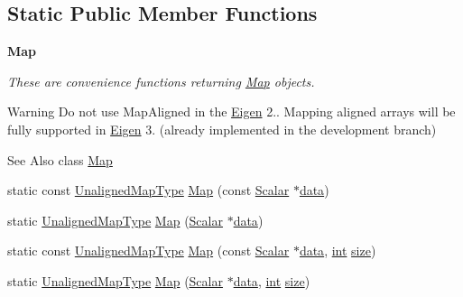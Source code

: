 \subsection*{Static Public Member Functions}
\begin{Indent}{\bf Map}\par
{\em These are convenience functions returning \hyperlink{class_map}{Map} objects.

\begin{DoxyWarning}{Warning}
Do not use Map\-Aligned in the \hyperlink{namespace_eigen}{Eigen} 2.. Mapping aligned arrays will be fully supported in \hyperlink{namespace_eigen}{Eigen} 3. (already implemented in the development branch)
\end{DoxyWarning}
\begin{DoxySeeAlso}{See Also}
class \hyperlink{class_map}{Map} 
\end{DoxySeeAlso}
}\begin{DoxyCompactItemize}
\item 
static const \hyperlink{class_matrix_a351013142295ee30707ec0025633dcde}{Unaligned\-Map\-Type} \hyperlink{class_matrix_a23e7b4c1536f9809b1062e5c95838df2}{Map} (const \hyperlink{class_matrix_base_a625df8339dc2d816cbc0fd66e7dadaf5}{Scalar} $\ast$\hyperlink{glext_8h_a8850df0785e6fbcc2351af3b686b8c7a}{data})
\item 
static \hyperlink{class_matrix_a351013142295ee30707ec0025633dcde}{Unaligned\-Map\-Type} \hyperlink{class_matrix_a93a1f6d3cf89282b75c94424ca4fa189}{Map} (\hyperlink{class_matrix_base_a625df8339dc2d816cbc0fd66e7dadaf5}{Scalar} $\ast$\hyperlink{glext_8h_a8850df0785e6fbcc2351af3b686b8c7a}{data})
\item 
static const \hyperlink{class_matrix_a351013142295ee30707ec0025633dcde}{Unaligned\-Map\-Type} \hyperlink{class_matrix_af03952254927925a7bde7e43728030a0}{Map} (const \hyperlink{class_matrix_base_a625df8339dc2d816cbc0fd66e7dadaf5}{Scalar} $\ast$\hyperlink{glext_8h_a8850df0785e6fbcc2351af3b686b8c7a}{data}, \hyperlink{ioapi_8h_a787fa3cf048117ba7123753c1e74fcd6}{int} \hyperlink{glext_8h_a014d89bd76f74ef3a29c8f04b473eb76}{size})
\item 
static \hyperlink{class_matrix_a351013142295ee30707ec0025633dcde}{Unaligned\-Map\-Type} \hyperlink{class_matrix_ad2afd4fd18c1c8f401b9ff01775bcb3c}{Map} (\hyperlink{class_matrix_base_a625df8339dc2d816cbc0fd66e7dadaf5}{Scalar} $\ast$\hyperlink{glext_8h_a8850df0785e6fbcc2351af3b686b8c7a}{data}, \hyperlink{ioapi_8h_a787fa3cf048117ba7123753c1e74fcd6}{int} \hyperlink{glext_8h_a014d89bd76f74ef3a29c8f04b473eb76}{size})

\end{DoxyCompactItemize}
\end{Indent}
